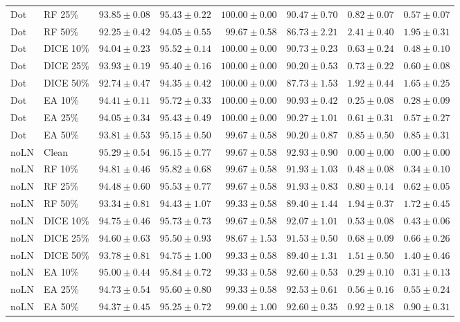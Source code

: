{\begin{longtable}{llrrrrrr}
Dot & RF 25\% & $93.85\pm0.08$ & $95.43\pm0.22$ & $100.00\pm0.00$ & $90.47\pm0.70$ & $0.82\pm0.07$ & $0.57\pm0.07$ \\
Dot & RF 50\% & $92.25\pm0.42$ & $94.05\pm0.55$ & $99.67\pm0.58$ & $86.73\pm2.21$ & $2.41\pm0.40$ & $1.95\pm0.31$ \\
Dot & DICE 10\% & $94.04\pm0.23$ & $95.52\pm0.14$ & $100.00\pm0.00$ & $90.73\pm0.23$ & $0.63\pm0.24$ & $0.48\pm0.10$ \\
Dot & DICE 25\% & $93.93\pm0.19$ & $95.40\pm0.16$ & $100.00\pm0.00$ & $90.20\pm0.53$ & $0.73\pm0.22$ & $0.60\pm0.08$ \\
Dot & DICE 50\% & $92.74\pm0.47$ & $94.35\pm0.42$ & $100.00\pm0.00$ & $87.73\pm1.53$ & $1.92\pm0.44$ & $1.65\pm0.25$ \\
Dot & EA 10\% & $94.41\pm0.11$ & $95.72\pm0.33$ & $100.00\pm0.00$ & $90.93\pm0.42$ & $0.25\pm0.08$ & $0.28\pm0.09$ \\
Dot & EA 25\% & $94.05\pm0.34$ & $95.43\pm0.49$ & $100.00\pm0.00$ & $90.27\pm1.01$ & $0.61\pm0.31$ & $0.57\pm0.27$ \\
Dot & EA 50\% & $93.81\pm0.53$ & $95.15\pm0.50$ & $99.67\pm0.58$ & $90.20\pm0.87$ & $0.85\pm0.50$ & $0.85\pm0.31$ \\
noLN & Clean & $95.29\pm0.54$ & $96.15\pm0.77$ & $99.67\pm0.58$ & $92.93\pm0.90$ & $0.00\pm0.00$ & $0.00\pm0.00$ \\
noLN & RF 10\% & $94.81\pm0.46$ & $95.82\pm0.68$ & $99.67\pm0.58$ & $91.93\pm1.03$ & $0.48\pm0.08$ & $0.34\pm0.10$ \\
noLN & RF 25\% & $94.48\pm0.60$ & $95.53\pm0.77$ & $99.67\pm0.58$ & $91.93\pm0.83$ & $0.80\pm0.14$ & $0.62\pm0.05$ \\
noLN & RF 50\% & $93.34\pm0.81$ & $94.43\pm1.07$ & $99.33\pm0.58$ & $89.40\pm1.44$ & $1.94\pm0.37$ & $1.72\pm0.45$ \\
noLN & DICE 10\% & $94.75\pm0.46$ & $95.73\pm0.73$ & $99.67\pm0.58$ & $92.07\pm1.01$ & $0.53\pm0.08$ & $0.43\pm0.06$ \\
noLN & DICE 25\% & $94.60\pm0.63$ & $95.50\pm0.93$ & $98.67\pm1.53$ & $91.53\pm0.50$ & $0.68\pm0.09$ & $0.66\pm0.26$ \\
noLN & DICE 50\% & $93.78\pm0.81$ & $94.75\pm1.00$ & $99.33\pm0.58$ & $89.40\pm1.31$ & $1.51\pm0.50$ & $1.40\pm0.46$ \\
noLN & EA 10\% & $95.00\pm0.44$ & $95.84\pm0.72$ & $99.33\pm0.58$ & $92.60\pm0.53$ & $0.29\pm0.10$ & $0.31\pm0.13$ \\
noLN & EA 25\% & $94.73\pm0.54$ & $95.60\pm0.80$ & $99.33\pm0.58$ & $92.53\pm0.61$ & $0.56\pm0.16$ & $0.55\pm0.24$ \\
noLN & EA 50\% & $94.37\pm0.45$ & $95.25\pm0.72$ & $99.00\pm1.00$ & $92.60\pm0.35$ & $0.92\pm0.18$ & $0.90\pm0.31$ \\
\end{longtable}
}

